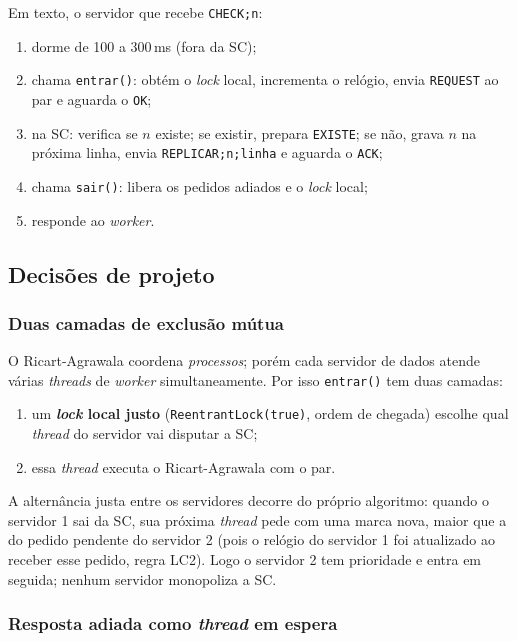 \documentclass[11pt,a4paper]{article}
\newcommand{\msg}[1]{\texttt{#1}}
\newcommand{\classe}[1]{\texttt{#1}}
\begin{document}
Em texto, o servidor que recebe \msg{CHECK;n}:

\begin{enumerate}
  \item dorme de 100 a 300\,ms (fora da SC);
  \item chama \texttt{entrar()}: obtém o \emph{lock} local, incrementa o relógio,
        envia \msg{REQUEST} ao par e aguarda o \msg{OK};
  \item na SC: verifica se $n$ existe; se existir, prepara \msg{EXISTE}; se não,
        grava $n$ na próxima linha, envia \msg{REPLICAR;n;linha} e aguarda o
        \msg{ACK};
  \item chama \texttt{sair()}: libera os pedidos adiados e o \emph{lock} local;
  \item responde ao \emph{worker}.
\end{enumerate}

\subsection{Decisões de projeto}

\subsubsection{Duas camadas de exclusão mútua}

O Ricart-Agrawala coordena \emph{processos}; porém cada servidor de dados atende
várias \emph{threads} de \emph{worker} simultaneamente. Por isso \texttt{entrar()}
tem duas camadas:

\begin{enumerate}
  \item um \textbf{\emph{lock} local justo} (\classe{ReentrantLock(true)}, ordem de
        chegada) escolhe qual \emph{thread} do servidor vai disputar a SC;
  \item essa \emph{thread} executa o Ricart-Agrawala com o par.
\end{enumerate}

A alternância justa entre os servidores decorre do próprio algoritmo: quando o
servidor 1 sai da SC, sua próxima \emph{thread} pede com uma marca nova, maior que a
do pedido pendente do servidor 2 (pois o relógio do servidor 1 foi atualizado ao
receber esse pedido, regra LC2). Logo o servidor 2 tem prioridade e entra em
seguida; nenhum servidor monopoliza a SC.

\subsubsection{Resposta adiada como \emph{thread} em espera}
\end{document}
